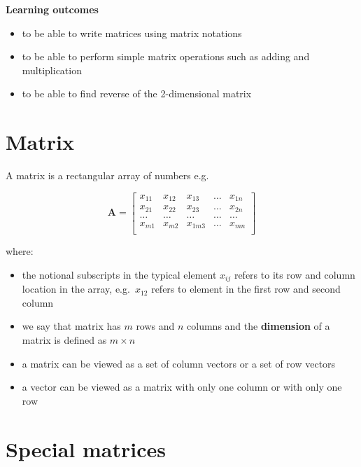 \documentclass[
]{book}
\providecommand{\tightlist}{%
  \setlength{\itemsep}{0pt}\setlength{\parskip}{0pt}}
\theoremstyle{definition}
\theoremstyle{definition}
\theoremstyle{definition}
\theoremstyle{remark}
\begin{document}
\textbf{Learning outcomes}

\begin{itemize}
\tightlist
\item
  to be able to write matrices using matrix notations
\item
  to be able to perform simple matrix operations such as adding and multiplication
\item
  to be able to find reverse of the 2-dimensional matrix
\end{itemize}

\hypertarget{matrix}{%
\section{Matrix}\label{matrix}}

A matrix is a rectangular array of numbers e.g.~

\[\mathbf{A}=\begin{bmatrix}
  x_{11} & x_{12} & x_{13} & \dots & x_{1n} \\
  x_{21} & x_{22} & x_{23} & \dots & x_{2n} \\
  \dots & \dots & \dots& \dots & \dots\\
  x_{m1} & x_{m2} & x_{1m3} & \dots & x_{mn} \\
\end{bmatrix}\]

where:

\begin{itemize}
\tightlist
\item
  the notional subscripts in the typical element \(x_{ij}\) refers to its row and column location in the array, e.g.~\(x_{12}\) refers to element in the first row and second column
\item
  we say that matrix has \(m\) rows and \(n\) columns and the \textbf{dimension} of a matrix is defined as \(m \times n\)
\item
  a matrix can be viewed as a set of column vectors or a set of row vectors
\item
  a vector can be viewed as a matrix with only one column or with only one row
\end{itemize}

\hypertarget{special-matrices}{%
\section{Special matrices}\label{special-matrices}}
\end{document}
